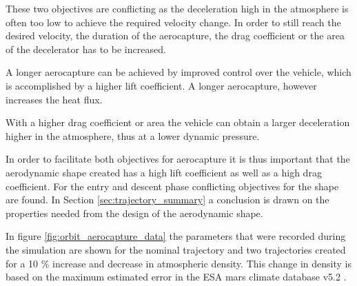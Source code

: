 These two objectives are conflicting as the deceleration high in the atmosphere is often too low to achieve the required velocity change. In order to still reach the desired velocity, the duration of the aerocapture, the drag coefficient or the area of the decelerator has to be increased. 

A longer aerocapture can be achieved by improved control over the vehicle, which is accomplished by a higher lift coefficient.  A longer aerocapture, however increases the heat flux. 

With a higher drag coefficient or area the vehicle can obtain a larger deceleration higher in the atmosphere, thus at a lower dynamic pressure.

In order to facilitate both objectives for aerocapture it is thus important that the aerodynamic shape created has a high lift coefficient as well as a high drag coefficient. For the entry and descent phase conflicting objectives for the shape are found. In Section \ref{sec:trajectory_summary} a conclusion is drawn on the properties needed from the design of the aerodynamic shape.

In figure \ref{fig:orbit_aerocapture_data} the parameters that were recorded during the simulation are shown for the nominal trajectory and two trajectories created for a 10 \% increase and decrease in atmospheric density. This change in density is based on the maximum estimated error in the ESA mars climate database v5.2 \cite{Lewis2015}.

